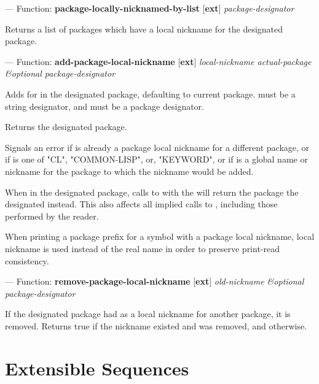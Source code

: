 \documentclass[10pt]{book}
\begin{document}
--- Function: \textbf{package-locally-nicknamed-by-list} [\textbf{ext}] \textit{package-designator}

\begin{adjustwidth}{5em}{5em}
Returns a list of packages which have a local nickname for the
designated package.
\end{adjustwidth}

--- Function: \textbf{add-package-local-nickname} [\textbf{ext}] \textit{local-nickname actual-package \&optional package-designator}

\begin{adjustwidth}{5em}{5em}
  Adds  for  in the designated
  package, defaulting to current package.  must be
  a string designator, and  must be a package
  designator.

  Returns the designated package.

  Signals an error if  is already a package local
  nickname for a different package, or if  is one
  of "CL", "COMMON-LISP", or, "KEYWORD", or if  is
  a global name or nickname for the package to which the nickname would
  be added.

  When in the designated package, calls to  with the
   will return the package the designated
   instead. This also affects all implied calls to
  , including those performed by the reader.

  When printing a package prefix for a symbol with a package local
  nickname, local nickname is used instead of the real name in order to
  preserve print-read consistency.
\end{adjustwidth}

--- Function: \textbf{remove-package-local-nickname} [\textbf{ext}] \textit{old-nickname \&optional package-designator}

\begin{adjustwidth}{5em}{5em}
  If the designated package had  as a local nickname
  for another package, it is removed. Returns true if the nickname
  existed and was removed, and  otherwise.
\end{adjustwidth}

\section{Extensible Sequences}
\end{document}
